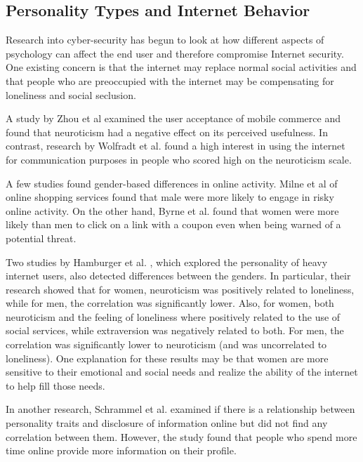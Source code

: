 \documentclass{sig-alternate}
\begin{document}
\subsection{Personality Types and Internet Behavior}
Research into cyber-security has begun to look at how different aspects of psychology can affect the end user and therefore compromise Internet security.
One existing concern is that the internet may replace normal social activities and that people who are preoccupied with the internet may be compensating for loneliness and social seclusion.

A study by Zhou et al \cite{ZL11} examined the user acceptance of mobile commerce and found that neuroticism had a negative effect on its perceived usefulness. In contrast,
research by Wolfradt et al. \cite{WD01} found a high interest in using the internet for communication purposes in people who scored high on the neuroticism scale.

A few studies found gender-based differences in online activity. Milne et al \cite{MLC09} of online shopping services found that male were more likely to engage in risky online activity. On the other hand, Byrne et al.  
found that women were more likely than men to click on a link with a coupon even when being warned of a potential threat.

Two 
studies by Hamburger et al. \cite{AB03, HB00}, 
which explored
the personality of heavy internet users,
also detected differences between the genders.  
In particular, 
their research showed that 
for women, neuroticism was positively related to loneliness, while for men, the correlation was significantly lower. Also, for women, both neuroticism and the feeling of loneliness where positively related to the use of social services, while extraversion was negatively related to both. For men, the correlation was significantly lower to neuroticism (and was uncorrelated to loneliness).
One explanation for these results may be that women are more sensitive to their emotional and social needs and 
realize
the ability of the internet to help fill those needs.  

In another research, Schrammel et al. \cite{SKT09} examined if there is a relationship between personality traits and disclosure of information online but did not find any correlation between them. However, the study found that people who spend more time online provide more information on their profile.


 
\end{document}

